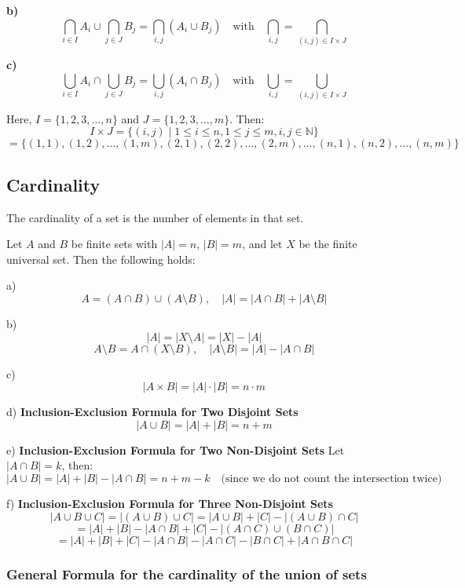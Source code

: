 \textbf{b)}
\[
\bigcap_{i \in I} A_i \cup \bigcap_{j \in J} B_j = \bigcap_{i,j} (A_i \cup B_j) \quad \text{with} \quad \bigcap_{i,j} = \bigcap_{(i,j) \in I \times J}
\]

\textbf{c)}
\[
\bigcup_{i \in I} A_i \cap \bigcup_{j \in J} B_j = \bigcup_{i,j} (A_i \cap B_j) \quad \text{with} \quad \bigcup_{i,j} = \bigcup_{(i,j) \in I \times J}
\]

Here, \( I = \{ 1, 2, 3, \dots, n \} \) and \( J = \{ 1, 2, 3, \dots, m \} \). Then:
\[
I \times J = \{ (i, j) \mid 1 \leq i \leq n, 1 \leq j \leq m, i, j \in \mathbb{N} \}
\]
\[
= \{ (1, 1), (1, 2), \dots, (1, m), (2, 1), (2, 2), \dots, (2, m), \dots, (n, 1), (n, 2), \dots, (n, m) \}
\]

\subsection{Cardinality}
The cardinality of a set is the number of elements in that set.

Let \( A \) and \( B \) be finite sets with \( |A| = n \), \( |B| = m \), and let \( X \) be the finite universal set. Then the following holds:

\textbf{}{a)}
\[
A = (A \cap B) \cup (A \setminus B), \quad |A| = |A \cap B| + |A \setminus B|
\]

\textbf{}{b)}
\[
|A| = |X \setminus A| = |X| - |A|
\]
\[
A \setminus B = A \cap (X \setminus B), \quad |A \setminus B| = |A| - |A \cap B|
\]

\textbf{}{c)}
\[
|A \times B| = |A| \cdot |B| = n \cdot m
\]

\textbf{}{d)} \textbf{Inclusion-Exclusion Formula for Two Disjoint Sets}
\[
|A \cup B| = |A| + |B| = n + m
\]

\textbf{}{e)} \textbf{Inclusion-Exclusion Formula for Two Non-Disjoint Sets}
Let \( |A \cap B| = k \), then:
\[
|A \cup B| = |A| + |B| - |A \cap B| = n + m - k \quad \text{(since we do not count the intersection twice)}
\]

\textbf{}{f)} \textbf{Inclusion-Exclusion Formula for Three Non-Disjoint Sets}
\[
|A \cup B \cup C| = |(A \cup B) \cup C| = |A \cup B| + |C| - |(A \cup B) \cap C|
\]
\[
= |A| + |B| - |A \cap B| + |C| - |(A \cap C) \cup (B \cap C)|
\]
\[
= |A| + |B| + |C| - |A \cap B| - |A \cap C| - |B \cap C| + |A \cap B \cap C|
\]

\subsubsection{General Formula for the cardinality of the union of sets}

